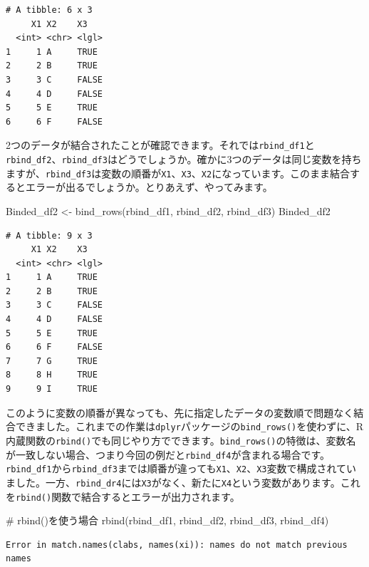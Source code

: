 \documentclass[
  a4paper,
  pandoc,
  ja=standard,
  jafont=haranoaji]{bxjsbook}
\newenvironment{Shaded}{\begin{snugshade}}{\end{snugshade}}
\newcommand{\CommentTok}[1]{\textcolor[rgb]{0.37,0.37,0.37}{#1}}
\newcommand{\FunctionTok}[1]{\textcolor[rgb]{0.28,0.35,0.67}{#1}}
\newcommand{\NormalTok}[1]{\textcolor[rgb]{0.00,0.48,0.65}{#1}}
\newcommand{\OtherTok}[1]{\textcolor[rgb]{0.00,0.48,0.65}{#1}}
\begin{document}
\begin{verbatim}
# A tibble: 6 x 3
     X1 X2    X3   
  <int> <chr> <lgl>
1     1 A     TRUE 
2     2 B     TRUE 
3     3 C     FALSE
4     4 D     FALSE
5     5 E     TRUE 
6     6 F     FALSE
\end{verbatim}

2つのデータが結合されたことが確認できます。それでは\texttt{rbind\_df1}と\texttt{rbind\_df2}、\texttt{rbind\_df3}はどうでしょうか。確かに3つのデータは同じ変数を持ちますが、\texttt{rbind\_df3}は変数の順番が\texttt{X1}、\texttt{X3}、\texttt{X2}になっています。このまま結合するとエラーが出るでしょうか。とりあえず、やってみます。

\begin{Shaded}
\begin{Highlighting}[numbers=left,,]
\NormalTok{Binded\_df2 }\OtherTok{\textless{}{-}} \FunctionTok{bind\_rows}\NormalTok{(rbind\_df1, rbind\_df2, rbind\_df3)}
\NormalTok{Binded\_df2}
\end{Highlighting}
\end{Shaded}

\begin{verbatim}
# A tibble: 9 x 3
     X1 X2    X3   
  <int> <chr> <lgl>
1     1 A     TRUE 
2     2 B     TRUE 
3     3 C     FALSE
4     4 D     FALSE
5     5 E     TRUE 
6     6 F     FALSE
7     7 G     TRUE 
8     8 H     TRUE 
9     9 I     TRUE 
\end{verbatim}

このように変数の順番が異なっても、先に指定したデータの変数順で問題なく結合できました。これまでの作業は\texttt{dplyr}パッケージの\texttt{bind\_rows()}を使わずに、R内蔵関数の\texttt{rbind()}でも同じやり方でできます。\texttt{bind\_rows()}の特徴は、変数名が一致しない場合、つまり今回の例だと\texttt{rbind\_df4}が含まれる場合です。\texttt{rbind\_df1}から\texttt{rbind\_df3}までは順番が違っても\texttt{X1}、\texttt{X2}、\texttt{X3}変数で構成されていました。一方、\texttt{rbind\_dr4}には\texttt{X3}がなく、新たに\texttt{X4}という変数があります。これを\texttt{rbind()}関数で結合するとエラーが出力されます。

\begin{Shaded}
\begin{Highlighting}[numbers=left,,]
\CommentTok{\# rbind()を使う場合}
\FunctionTok{rbind}\NormalTok{(rbind\_df1, rbind\_df2, rbind\_df3, rbind\_df4)}
\end{Highlighting}
\end{Shaded}

\begin{verbatim}
Error in match.names(clabs, names(xi)): names do not match previous names
\end{verbatim}
\end{document}
